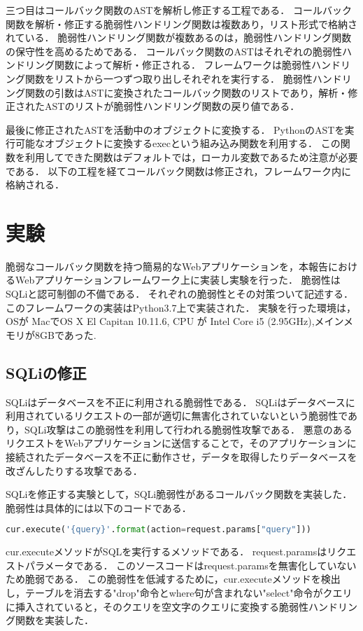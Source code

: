 \documentclass[twocolumn, 10pt, a4paper]{jsarticle}
\begin{document}
三つ目はコールバック関数のASTを解析し修正する工程である．
コールバック関数を解析・修正する脆弱性ハンドリング関数は複数あり，リスト形式で格納されている．
脆弱性ハンドリング関数が複数あるのは，脆弱性ハンドリング関数の保守性を高めるためである．
コールバック関数のASTはそれぞれの脆弱性ハンドリング関数によって解析・修正される．
フレームワークは脆弱性ハンドリング関数をリストから一つずつ取り出しそれぞれを実行する．
脆弱性ハンドリング関数の引数はASTに変換されたコールバック関数のリストであり，解析・修正されたASTのリストが脆弱性ハンドリング関数の戻り値である．

最後に修正されたASTを活動中のオブジェクトに変換する．
PythonのASTを実行可能なオブジェクトに変換するexecという組み込み関数を利用する．
この関数を利用してできた関数はデフォルトでは，ローカル変数であるため注意が必要である．
以下の工程を経てコールバック関数は修正され，フレームワーク内に格納される．

\section{実験}
脆弱なコールバック関数を持つ簡易的なWebアプリケーションを，本報告におけるWebアプリケーションフレームワーク上に実装し実験を行った．
脆弱性はSQLiと認可制御の不備である．
それぞれの脆弱性とその対策ついて記述する．
このフレームワークの実装はPython3.7上で実装された．
実験を行った環境は，OSが MacでOS X El Capitan 10.11.6, CPU が Intel Core i5 (2.95GHz),メインメモリが8GBであった.

\subsection{SQLiの修正}
SQLiはデータベースを不正に利用される脆弱性である．
SQLiはデータベースに利用されているリクエストの一部が適切に無害化されていないという脆弱性であり，SQLi攻撃はこの脆弱性を利用して行われる脆弱性攻撃である．
悪意のあるリクエストをWebアプリケーションに送信することで，そのアプリケーションに接続されたデータベースを不正に動作させ，データを取得したりデータベースを改ざんしたりする攻撃である．

SQLiを修正する実験として，SQLi脆弱性があるコールバック関数を実装した．
脆弱性は具体的には以下のコードである．
\begin{lstlisting}[language=python]
cur.execute('{query}'.format(action=request.params["query"]))
\end{lstlisting}
cur.executeメソッドがSQLを実行するメソッドである．
request.paramsはリクエストパラメータである．
このソースコードはrequest.paramsを無害化していないため脆弱である．
この脆弱性を低減するために，cur.executeメソッドを検出し，テーブルを消去する"drop"命令とwhere句が含まれない"select"命令がクエリに挿入されていると，そのクエリを空文字のクエリに変換する脆弱性ハンドリング関数を実装した．
\end{document}

